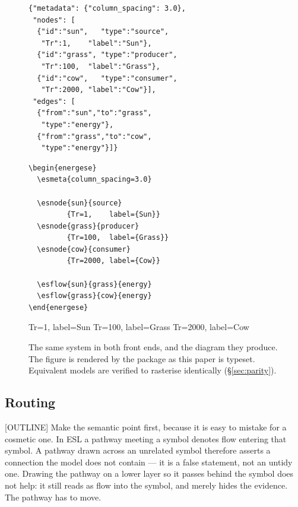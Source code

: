 \begin{figure}[htbp]
\begin{minipage}[t]{0.48\textwidth}
\begin{lstlisting}[title=JSON]
{"metadata": {"column_spacing": 3.0},
 "nodes": [
  {"id":"sun",   "type":"source",
   "Tr":1,    "label":"Sun"},
  {"id":"grass", "type":"producer",
   "Tr":100,  "label":"Grass"},
  {"id":"cow",   "type":"consumer",
   "Tr":2000, "label":"Cow"}],
 "edges": [
  {"from":"sun","to":"grass",
   "type":"energy"},
  {"from":"grass","to":"cow",
   "type":"energy"}]}
\end{lstlisting}
\end{minipage}\hfill
\begin{minipage}[t]{0.48\textwidth}
\begin{lstlisting}[title=\TeX]
\begin{energese}
  \esmeta{column_spacing=3.0}

  \esnode{sun}{source}
         {Tr=1,    label={Sun}}
  \esnode{grass}{producer}
         {Tr=100,  label={Grass}}
  \esnode{cow}{consumer}
         {Tr=2000, label={Cow}}

  \esflow{sun}{grass}{energy}
  \esflow{grass}{cow}{energy}
\end{energese}
\end{lstlisting}
\end{minipage}

\vspace{1em}
\centering
\begin{energese}[scale=0.8]
       {Tr=1,    label={Sun}}
   {Tr=100,  label={Grass}}
     {Tr=2000, label={Cow}}
\end{energese}

\caption{The same system in both front ends, and the diagram they produce. The
figure is rendered by the package as this paper is typeset. Equivalent models
are verified to rasterise identically (\S\ref{sec:parity}).}
\label{fig:frontends}
\end{figure}

\subsection{Routing}

[OUTLINE] Make the semantic point first, because it is easy to mistake for a
cosmetic one. In ESL a pathway meeting a symbol denotes flow entering that
symbol. A pathway drawn across an unrelated symbol therefore asserts a
connection the model does not contain --- it is a false statement, not an
untidy one. Drawing the pathway on a lower layer so it passes behind the symbol
does not help: it still reads as flow into the symbol, and merely hides the
evidence. The pathway has to move.

